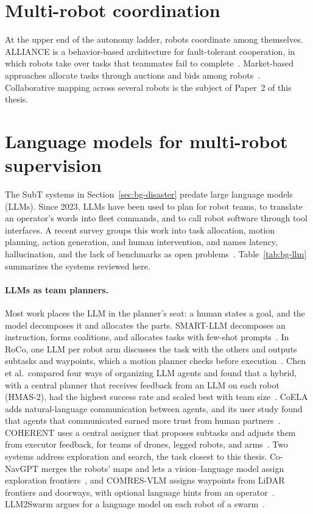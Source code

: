 \section{Multi-robot coordination}
\label{sec:bg-coordination}

At the upper end of the autonomy ladder, robots coordinate among themselves.
ALLIANCE is a behavior-based architecture for fault-tolerant cooperation, in which robots take over tasks that teammates fail to complete~\citep{parker1998alliance}.
Market-based approaches allocate tasks through auctions and bids among robots~\citep{dias2006market}.
Collaborative mapping across several robots is the subject of Paper~2 of this thesis.

\section{Language models for multi-robot supervision}
\label{sec:bg-llm}

The SubT systems in Section~\ref{sec:bg-disaster} predate large language models (LLMs).
Since 2023, LLMs have been used to plan for robot teams, to translate an operator's words into fleet commands, and to call robot software through tool interfaces.
A recent survey groups this work into task allocation, motion planning, action generation, and human intervention, and names latency, hallucination, and the lack of benchmarks as open problems~\citep{li2026llmmrs}.
Table~\ref{tab:bg-llm} summarizes the systems reviewed here.

\paragraph{LLMs as team planners.}
Most work places the LLM in the planner's seat: a human states a goal, and the model decomposes it and allocates the parts.
SMART-LLM decomposes an instruction, forms coalitions, and allocates tasks with few-shot prompts~\citep{kannan2024smartllm}.
In RoCo, one LLM per robot arm discusses the task with the others and outputs subtasks and waypoints, which a motion planner checks before execution~\citep{mandi2024roco}.
Chen et al.\ compared four ways of organizing LLM agents and found that a hybrid, with a central planner that receives feedback from an LLM on each robot (HMAS-2), had the highest success rate and scaled best with team size~\citep{chen2024scalable}.
CoELA adds natural-language communication between agents, and its user study found that agents that communicated earned more trust from human partners~\citep{zhang2024coela}.
COHERENT uses a central assigner that proposes subtasks and adjusts them from executor feedback, for teams of drones, legged robots, and arms~\citep{liu2025coherent}.
Two systems address exploration and search, the task closest to this thesis.
Co-NavGPT merges the robots' maps and lets a vision--language model assign exploration frontiers~\citep{yu2026conavgpt}, and COMRES-VLM assigns waypoints from LiDAR frontiers and doorways, with optional language hints from an operator~\citep{wang2025comresvlm}.
LLM2Swarm argues for a language model on each robot of a swarm~\citep{strobel2024llm2swarm}.

